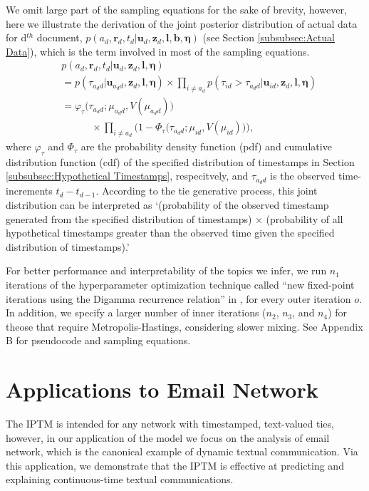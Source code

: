 \documentclass[twoside]{article}
\begin{document}
   We omit large part of the sampling equations for the sake of brevity, however, here we illustrate the derivation of the joint posterior distribution of actual data for d$^{th}$ document, $p(a_d, \boldsymbol{r}_d, t_d|\boldsymbol{u}_{d}, \boldsymbol{z}_d,\boldsymbol{l}, \boldsymbol{b}, \boldsymbol{\eta})$ (see Section \ref{subsubsec:Actual Data}), which is the term involved in most of the sampling equations. 
  \begin{equation*}
  \begin{aligned}
  &p(a_d, \boldsymbol{r}_d, t_d|\boldsymbol{u}_{d}, \boldsymbol{z}_d,\boldsymbol{l}, \boldsymbol{\eta}) \\&= p(\tau_{a_d d}|\boldsymbol{u}_{a_dd},\boldsymbol{z}_d,\boldsymbol{l}, \boldsymbol{\eta})\times \prod_{i\neq a_d} p(\tau_{id} >\tau_{a_d d}|\boldsymbol{u}_{id},\boldsymbol{z}_d,\boldsymbol{l}, \boldsymbol{\eta}) \\& 
  = \varphi_{\tau}\big(\tau_{a_d d}; \mu_{a_d d}, V(\mu_{a_d d})\big)\\&\quad\quad\quad \times  \prod_{i\neq a_d}\Big(1-\Phi_{\tau} \big(\tau_{a_d d}; \mu_{i d}, V(\mu_{i d})\big) \Big),
  \end{aligned}
    \label{eqn:tieposterior}
\end{equation*}  
  where $\varphi_\tau$ and $\Phi_\tau$ are the probability density function (pdf) and cumulative distribution function (cdf) of the specified distribution of timestamps in Section \ref{subsubsec:Hypothetical Timestamps}, respecitvely, and $\tau_{a_d d}$ is the observed time-increments $t_d - t_{d-1}$. According to the tie generative process, this joint distribution can be interpreted as `(probability of the observed timestamp generated from the specified distribution of timestamps) $\times$ (probability of all hypothetical timestamps greater than the observed time given the specified distribution of timestamps).' 
 
For better performance and interpretability of the topics we infer, we run $n_1$ iterations of the hyperparameter optimization technique called ``new fixed-point iterations using the Digamma recurrence relation'' in \cite{wallach2008structured}, for every outer iteration $o$. In addition, we specify a larger number of inner iterations ($n_2$, $n_3$, and $n_4$) for theose that require Metropolis-Hastings, considering slower mixing. See Appendix B for pseudocode and sampling equations.  

\section{Applications to Email Network}\label{sec:Application}
The IPTM is intended for any network with timestamped, text-valued ties, however, in our application of the model we focus on the analysis of email network, which is the canonical example of dynamic textual communication. Via this application, we demonstrate that the IPTM is effective at predicting
and explaining continuous-time textual communications.
\end{document}
